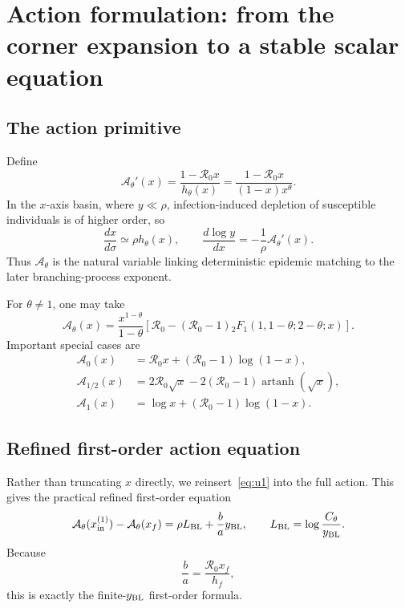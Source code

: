 \documentclass[11pt,a4paper]{article}
\newcommand{\Rzero}{\mathcal R_0}
\newcommand{\Afun}{\mathcal A_\theta}
\newcommand{\BL}{y_{\rm BL}}
\newcommand{\xf}{x_f}
\begin{document}
\section{Action formulation: from the corner expansion to a stable scalar equation}
\subsection{The action primitive}
Define
\begin{equation}
\label{eq:Adef}
\Afun'(x)
=\frac{1-\Rzero x}{h_\theta(x)}
=\frac{1-\Rzero x}{(1-x)x^\theta}.
\end{equation}
In the $x$-axis basin, where $y\ll\rho$, infection-induced depletion of susceptible individuals is of higher order, so
\[
\frac{dx}{d\sigma}\simeq\rho h_\theta(x),
\qquad
\frac{d\log y}{dx}
=-\frac1\rho\Afun'(x).
\]
Thus $\Afun$ is the natural variable linking deterministic epidemic matching to the later branching-process exponent.

For $\theta\neq1$, one may take
\begin{equation}
\label{eq:Ahyper}
\Afun(x)
=\frac{x^{1-\theta}}{1-\theta}
\left[
\Rzero-(\Rzero-1)
{}_2F_1(1,1-\theta;2-\theta;x)
\right].
\end{equation}
Important special cases are
\begin{align}
\mathcal A_0(x)
&=\Rzero x+(\Rzero-1)\log(1-x),\\
\mathcal A_{1/2}(x)
&=2\Rzero\sqrt{x}-2(\Rzero-1)\operatorname{artanh}(\sqrt{x}),\\
\mathcal A_1(x)
&=\log x+(\Rzero-1)\log(1-x).
\end{align}

\subsection{Refined first-order action equation}
Rather than truncating $x$ directly, we reinsert~\eqref{eq:u1} into the full action. This gives the practical refined first-order equation
\begin{equation}
\label{eq:M1}
\Afun(x_{\rm in}^{(1)})-\Afun(\xf)
=\rho L_{\rm BL}+\frac ba\BL,
\qquad
L_{\rm BL}=\log\frac{C_\theta}{\BL}.
\end{equation}
Because
\[
\frac ba=\frac{\Rzero\xf}{h_f},
\]
this is exactly the finite-$\BL$ first-order formula.
\end{document}
